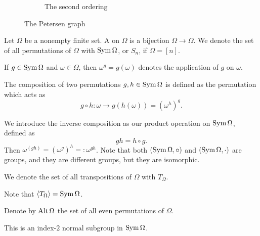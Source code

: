 \begin{figure*}[ht!]
\begin{subfigure}{0.4\linewidth}
	\caption{The second ordering}%
	\label{fig:sg-01-petersen-relabeled}
  \end{subfigure}
  \caption{The Petersen graph}
\end{figure*}

\begin{definition}
  Let $\Omega$ be a nonempty finite set.
  A  on $\Omega$ is a bijection $\Omega \to \Omega$.
  We denote the set of all permutations of $\Omega$ with $\operatorname{Sym} \Omega$, or
  $S_n$, if $\Omega = [n]$.
\end{definition}

\begin{definition}
  If $g \in \operatorname{Sym} \Omega$ and $\omega \in \Omega$, then $\omega^g = g(\omega)$
  denotes the application of $g$ on $\omega$.
\end{definition}

\begin{definition}
  The composition of two permutations $g, h \in \operatorname{Sym} \Omega$ is defined as the
  permutation which acts as
  \[
	g \circ h: \omega \to g(h(\omega)) = {(\omega^h)}^g.
  \]
\end{definition}

We introduce the inverse composition as our product operation on $\operatorname{Sym} \Omega$,
defined as
\[
  gh = h \circ g.
\]
Then $\omega^{(g h)} = {(\omega^g)}^h =: \omega^{gh}$.
Note that both $(\operatorname{Sym} \Omega, \circ)$ and $(\operatorname{Sym} \Omega, \cdot)$ are groups, and
they are different groups, but they are isomorphic.

\begin{definition}
  We denote the set of all transpositions of $\Omega$ with $T_\Omega$.
\end{definition}

\begin{remark}
  Note that $\left< T_\Omega \right> = \operatorname{Sym} \Omega$.
\end{remark}

\begin{definition}
  Denote by $\operatorname{Alt} \Omega$ the set of all even permutations of $\Omega$.
\end{definition}

\begin{remark}
  This is an index-$2$ normal subgroup in $\operatorname{Sym} \Omega$.
\end{remark}

